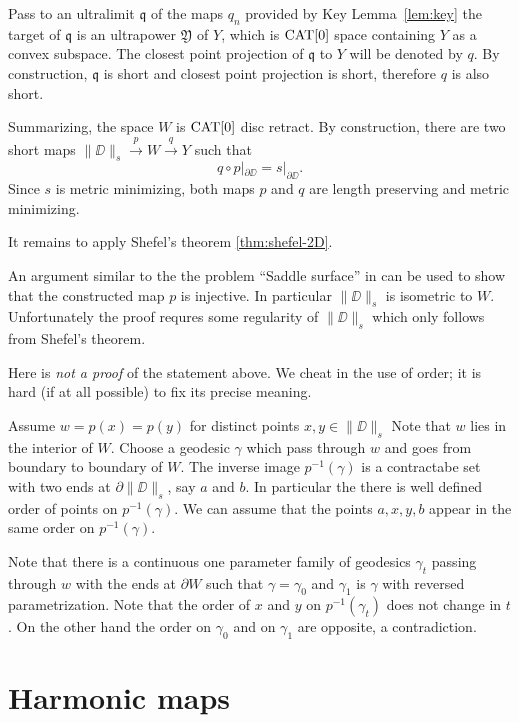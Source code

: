 \documentclass[a4paper,10pt]{amsart}
\begin{document}
Pass to an ultralimit $\mathfrak{q}$ of the maps $q_n$ provided by Key Lemma~\ref{lem:key} the target of $\mathfrak{q}$ is an ultrapower  $\mathfrak{Y}$ of $Y$,
which is $\mathop{\rm CAT}\nolimits[0]$ space containing $Y$ as a convex subspace.
The closest point projection of $\mathfrak{q}$ to $Y$ will be denoted by $q$.
By construction, 
$\mathfrak{q}$ is short 
and closest point projection is short,
therefore $q$ is also short.


Summarizing, the space $W$ is $\mathop{\rm CAT}\nolimits[0]$ disc retract.
By construction, there are two short maps 
$\|\DD\|_s\xrightarrow{p} W \xrightarrow{q} Y$
such that 
\[q\circ p|_{\partial\DD}=s|_{\partial\DD}.\] 
Since $s$ is metric minimizing, both maps $p$ and $q$ are length preserving and metric minimizing.

It remains to apply Shefel's theorem \ref{thm:shefel-2D}.
\qeds



 An argument similar to the the problem ``Saddle surface'' in \cite{petrunin-orthodox}
can be used to show that the constructed map $p$ 
is injective. 
In particular $\|\DD\|_s$ is isometric to $W$.
Unfortunately the proof requres some regularity of $\|\DD\|_s$ which only follows from Shefel's theorem. 

Here is \emph{not a proof} of the statement above.
We cheat in the use of order; 
it is hard (if at all possible) to fix its precise meaning.

 Assume  $w=p(x)=p(y)$ for distinct points $x,y\in\|\DD\|_s$
Note that  $w$ lies in the interior of $W$.
Choose a geodesic $\gamma$ which pass through $w$ and goes 
from boundary to boundary of $W$.
The inverse image $p^{-1}(\gamma)$ is a contractabe set with two ends at $\partial\|\DD\|_s$, say $a$ and $b$.
In particular the there is well defined order of  points on $p^{-1}(\gamma)$.
We can assume that the points $a,x,y,b$ appear in the same order on $p^{-1}(\gamma)$. 

Note that there is a continuous one parameter family of geodesics $\gamma_t$ passing through $w$ with the ends at $\partial W$
such that $\gamma=\gamma_0$ and $\gamma_1$ is $\gamma$ with reversed parametrization.
Note that the order of $x$ and $y$ on $p^{-1}(\gamma_t)$ does not change in $t$.
On the other hand the order on $\gamma_0$ and on $\gamma_1$ are opposite, a contradiction.\qeds 

\section{Harmonic maps}
\end{document}
